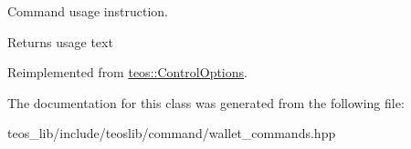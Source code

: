 Command \textquotesingle{}usage\textquotesingle{} instruction. 

\begin{DoxyReturn}{Returns}
usage text 
\end{DoxyReturn}


Reimplemented from \mbox{\hyperlink{classteos_1_1_control_options_a0aa5671f9bc750ed5280c26c543874f3}{teos\+::\+Control\+Options}}.



The documentation for this class was generated from the following file\+:\begin{DoxyCompactItemize}
\item 
teos\+\_\+lib/include/teoslib/command/wallet\+\_\+commands.\+hpp\end{DoxyCompactItemize}
